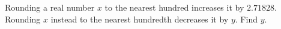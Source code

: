 Rounding a real number $x$ to the nearest hundred increases it by $2.71828$. Rounding $x$ instead to the nearest hundredth decreases it by $y$. Find $y$.
